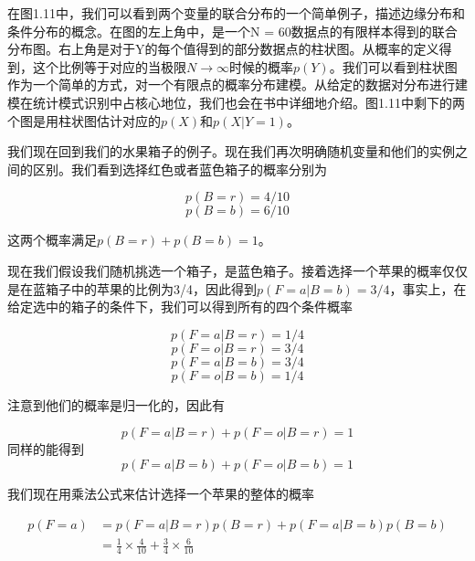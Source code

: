 	在图1.11中，我们可以看到两个变量的联合分布的一个简单例子，描述边缘分布和条件分布的概念。在图的左上角中，是一个N = 60数据点的有限样本得到的联合分布图。右上角是对于Y的每个值得到的部分数据点的柱状图。从概率的定义得到，这个比例等于对应的当极限$N \to \infty$时候的概率$p(Y)$。我们可以看到柱状图作为一个简单的方式，对一个有限点的概率分布建模。从给定的数据对分布进行建模在统计模式识别中占核心地位，我们也会在书中详细地介绍。图1.11中剩下的两个图是用柱状图估计对应的$p(X)$和$p(X|Y = 1)$。
	
	我们现在回到我们的水果箱子的例子。现在我们再次明确随机变量和他们的实例之间的区别。我们看到选择红色或者蓝色箱子的概率分别为
	
	\begin{equation}
	p(B = r) = 4/10
	\end{equation}
	\begin{equation}
	p(B = b) = 6/10
	\end{equation}
	
	这两个概率满足$p(B = r) + p(B = b) = 1$。
	
	现在我们假设我们随机挑选一个箱子，是蓝色箱子。接着选择一个苹果的概率仅仅是在蓝箱子中的苹果的比例为3/4，因此得到$p(F = a| B = b) = 3/4$，事实上，在给定选中的箱子的条件下，我们可以得到所有的四个条件概率
	
	\begin{equation}
	p(F = a|B = r) = 1/4
	\end{equation}
	\begin{equation}
	p(F = o|B = r) = 3/4
	\end{equation}
	\begin{equation}
	p(F = a|B = b) = 3/4
	\end{equation}
	\begin{equation}
	p(F = o|B = b) = 1/4
	\end{equation}
	
	注意到他们的概率是归一化的，因此有
	
	\begin{equation}
	p(F = a|B = r) + p(F = o| B = r) = 1
	\end{equation}
	同样的能得到
	\begin{equation}
	p(F = a|B = b) + p(F = o|B = b) = 1
	\end{equation}
	
	我们现在用乘法公式来估计选择一个苹果的整体的概率
	
	\begin{equation}
	\begin{aligned}
	p(F = a) & = p(F = a|B = r)p(B = r) +p(F = a|B = b)p(B = b)\\
			 & = \frac{1}{4} \times \frac{4}{10} + \frac{3}{4} \times \frac{6}{10}
	\end{aligned}
	\end{equation}
	
